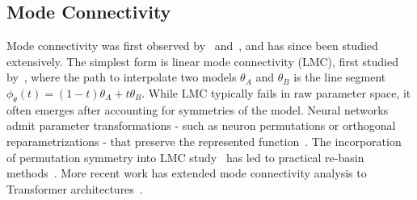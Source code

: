 \documentclass{article}
\begin{document}
\subsection{Mode Connectivity}
Mode connectivity was first observed by~\citet{garipov2018losssurfacesmodeconnectivity} and~\citet{draxler2019essentiallybarriersneuralnetwork}, and has since been studied extensively. The simplest form is linear mode connectivity (LMC), first studied by~\citet{frankle2020linearmodeconnectivitylottery}, where the path to interpolate two models $\theta_A$ and $\theta_B$ is the line segment $\phi_\theta(t)=(1-t)\theta_A + t\theta_B$. While LMC typically fails in raw parameter space, it often emerges after accounting for symmetries of the model. Neural networks admit parameter transformations - such as neuron permutations or orthogonal reparametrizations - that preserve the represented function~\citep{zhao2023symmetryteleportationacceleratedoptimization,zhao2024improvingconvergencegeneralizationusing,zhao2025understandingmodeconnectivityparameter,theus2025generalizedlinearmodeconnectivity,tran2025linearmodeconnectivitymixtureofexperts}. The incorporation of permutation symmetry into LMC study~\citep{entezari2022rolepermutationinvariancelinear} has led to practical re-basin methods~\citep{pena2022rebasinimplicitsinkhorndifferentiation,ainsworth2023gitrebasinmergingmodels,singh2023modelfusionoptimaltransport}. More recent work has extended mode connectivity analysis to Transformer architectures~\citep{imfeld2024transformerfusionoptimaltransport,verma2024mergingtexttransformermodels,theus2025generalizedlinearmodeconnectivity}.


\end{document}

